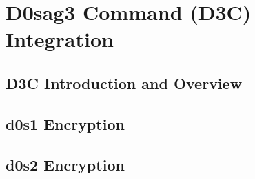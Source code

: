 \chapter{D0sag3 Command (D3C) Integration} \label{D3C}
\pagestyle{fancy}

\section{D3C Introduction and Overview}

\section{d0s1 Encryption}

\section{d0s2 Encryption}

